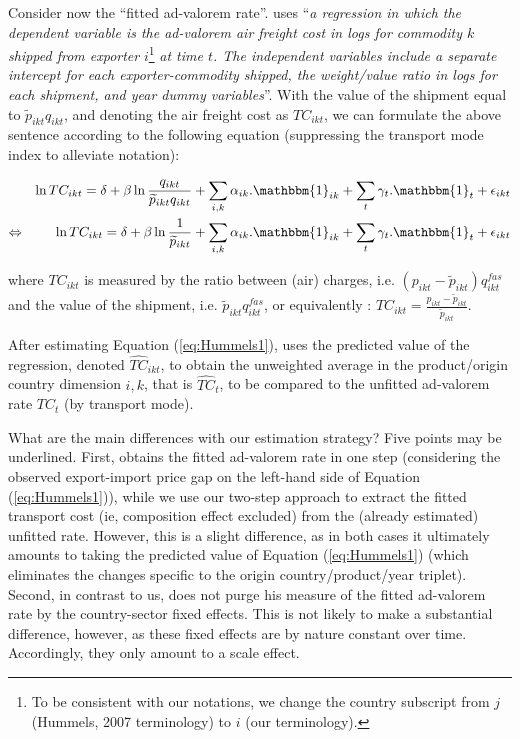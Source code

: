 \documentclass[a4paper,11pt]{article}
\begin{document}
Consider now the ``fitted ad-valorem rate''.
\cite{hummels2007} uses ``\textit{a regression in which the dependent variable is the ad-valorem air freight cost in logs for commodity $k$ shipped from exporter} $i$\footnote{To be consistent with our notations, we change the country subscript from $j$ (Hummels, 2007 terminology) to $i$ (our terminology).} \textit{at time $t$.
The independent variables include a separate intercept for each exporter-commodity shipped, the weight/value ratio in logs for each shipment, and year dummy variables}''.
With the value of the shipment equal to $\widetilde{p}_{ikt}q_{ikt}$, and denoting the air freight cost as $TC_{ikt}$, we can formulate the above sentence according to the following equation (suppressing the transport mode index to alleviate notation):

\begin{eqnarray}
&&\ln TC_{ikt} = \delta+ \beta \ln \frac{q_{ikt}}{\widetilde{p}_{ikt}q_{ikt}} + \sum_{i,k}\alpha_{ik}.\mathbbm{1}_{ik}+ \sum_{t}\gamma_{t}.\mathbbm{1}_{t} + \epsilon_{ikt} \notag \\
\Leftrightarrow && \ln TC_{ikt} = \delta+ \beta \ln \frac{1}{\widetilde{p}_{ikt}} + \sum_{i,k}\alpha_{ik}.\mathbbm{1}_{ik}+ \sum_{t}\gamma_{t}.\mathbbm{1}_{t} + \epsilon_{ikt} \label{eq:Hummels1}
\end{eqnarray}

\noindent where $TC_{ikt}$ is measured by the ratio between (air) charges, i.e.
$(p_{ikt} - \widetilde{p}_{ikt})q^{fas}_{ikt}$ and the value of the shipment, i.e.
$\widetilde{p}_{ikt}q^{fas}_{ikt}$, or equivalently : $TC_{ikt} = \frac{p_{ikt} - \widetilde{p}_{ikt}}{\widetilde{p}_{ikt}}$.\medskip

After estimating Equation (\ref{eq:Hummels1}), \cite{hummels2007} uses the predicted value of the regression, denoted $\widehat{TC}_{ikt}$, to obtain the unweighted average in the product/origin country dimension $i,k$, that is $\widehat{TC}_{t}$, to be compared to the unfitted ad-valorem rate $TC_{t}$ (by transport mode).\medskip

What are the main differences with our estimation strategy? Five points may be underlined.
First, \cite{hummels2007} obtains the fitted ad-valorem rate in one step (considering the observed export-import price gap on the left-hand side of Equation (\ref{eq:Hummels1})), while we use our two-step approach to extract the fitted transport cost (ie, composition effect excluded) from the (already estimated) unfitted rate.
However, this is a slight difference, as in both cases it ultimately amounts to taking the predicted value of Equation (\ref{eq:Hummels1}) (which eliminates the changes specific to the origin country/product/year triplet).
Second, in contrast to us, \cite{hummels2007} does not purge his measure of the fitted ad-valorem rate by the country-sector fixed effects.
This is not likely to make a substantial difference, however, as these fixed effects are by nature constant over time. Accordingly, they only amount to a scale effect.
\end{document}
